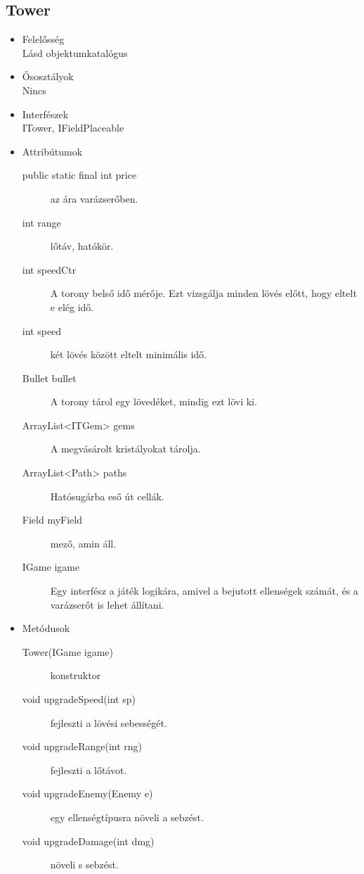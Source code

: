 \subsection{Tower}
\begin{itemize}
\item Felelősség\\
Lásd objektumkatalógus
\item Ősosztályok\\
Nincs
\item Interfészek\\
ITower, IFieldPlaceable
\item Attribútumok\\
	\begin{description}
		\item[public static final int price] az ára varázserőben.
\item[int range] lőtáv, hatókör.
\item[int speedCtr] A torony belső idő mérője. Ezt vizsgálja minden lövés előtt, hogy eltelt e elég idő.
\item[int speed] két lövés között eltelt minimális idő.
\item[Bullet bullet] A torony tárol egy lövedéket, mindig ezt lövi ki.
\item[ArrayList<ITGem> gems] A megvásárolt kristályokat tárolja.
\item[ArrayList<Path> paths] Hatósugárba eső út cellák.
\item[Field myField] mező, amin áll.
\item[IGame igame] Egy interfész a játék logikára, amivel a bejutott ellenségek számát, és a varázserőt is lehet állítani.

	\end{description}
\item Metódusok\\
	\begin{description}
		\item[Tower(IGame igame)] konstruktor
\item[void upgradeSpeed(int sp)] fejleszti a lövési sebességét.
\item[void upgradeRange(int rng)] fejleszti a lőtávot.
\item[void upgradeEnemy(Enemy e)] egy ellenségtípusra növeli a sebzést.
\item[void upgradeDamage(int dmg)] növeli s sebzést.

		
		
	\end{description}
\end{itemize}
